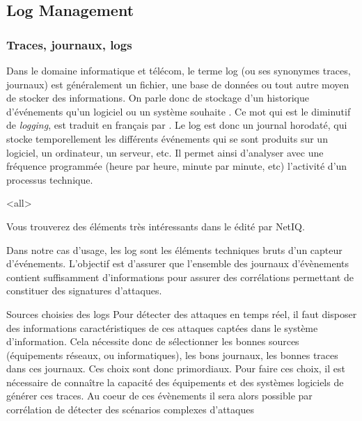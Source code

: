 
\subsection{Log Management }

\subsubsection{Traces, journaux, logs}

Dans le domaine informatique et télécom, le terme log (ou ses synonymes traces, journaux) est généralement un fichier, une base de données ou tout autre moyen de stocker des informations.  On parle  donc de stockage d'un historique d'événements qu'un logiciel ou un système souhaite . 
Ce mot qui est le diminutif  de \textit{logging}, est traduit en français par . Le log est donc un journal horodaté, qui stocke temporellement les différents événements qui se sont produits sur un  logiciel, un ordinateur, un serveur, etc. Il permet ainsi d'analyser avec une fréquence programmée (heure par heure,  minute par minute, etc) l'activité  d'un processus technique.  

\mode<all>{}

Vous trouverez des éléments très intéressants  dans le 
 édité par NetIQ.

Dans notre cas d'usage, les log sont les éléments techniques  bruts d'un capteur d'événements. L'objectif est d'assurer que l'ensemble des journaux d'évènements contient suffisamment d'informations pour assurer des corrélations permettant de  constituer des signatures d'attaques. 

\begin{notebox}{Sources choisies des logs }
Pour détecter des attaques en temps réel, il faut disposer des informations caractéristiques de ces attaques captées dans le système d'information. Cela nécessite donc de sélectionner les bonnes sources (équipements réseaux, ou informatiques), les bons journaux, les bonnes traces dans ces journaux.  Ces choix sont donc primordiaux. Pour faire ces choix, il est nécessaire de connaître la capacité des équipements et des systèmes logiciels de générer ces traces. Au coeur de ces évènements il sera alors possible par corrélation de détecter des scénarios complexes d'attaques
\end{notebox} 

